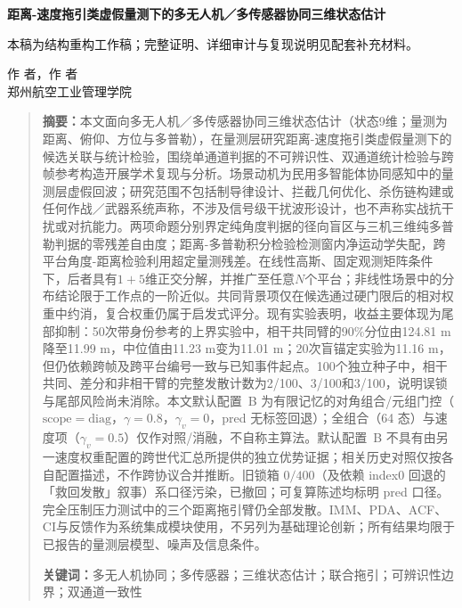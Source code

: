\documentclass[UTF8,a4paper,zihao=-4]{ctexart}
\begin{document}
\begin{center}{\LARGE\bfseries 距离-速度拖引类虚假量测下的多无人机／多传感器协同三维状态估计\par}\end{center}
本稿为结构重构工作稿；完整证明、详细审计与复现说明见配套补充材料。

\begin{center}作 者，作 者\\郑州航空工业管理学院\end{center}

\begin{quote}\small
\textbf{摘要：}本文面向多无人机／多传感器协同三维状态估计（状态9维；量测为距离、俯仰、方位与多普勒），在量测层研究距离-速度拖引类虚假量测下的候选关联与统计检验，围绕单通道判据的不可辨识性、双通道统计检验与跨帧参考构造开展学术复现与分析。场景动机为民用多智能体协同感知中的量测层虚假回波；研究范围不包括制导律设计、拦截几何优化、杀伤链构建或任何作战／武器系统声称，不涉及信号级干扰波形设计，也不声称实战抗干扰或对抗能力。两项命题分别界定纯角度判据的径向盲区与三机三维纯多普勒判据的零残差自由度；距离-多普勒积分检验检测窗内净运动学失配，跨平台角度-距离检验利用超定量测残差。在线性高斯、固定观测矩阵条件下，后者具有\(1+5\)维正交分解，并推广至任意\(N\)个平台；非线性场景中的分布结论限于工作点的一阶近似。共同背景项仅在候选通过硬门限后的相对权重中约消，复合权重仍属于启发式评分。现有实验表明，收益主要体现为尾部抑制：50次带身份参考的上界实验中，相干共同臂的90\%分位由124.81 m降至11.99 m，中位值由11.23 m变为11.01 m；20次盲锚定实验为11.16 m，但仍依赖跨帧及跨平台编号一致与已知事件起点。100个独立种子中，相干共同、差分和非相干臂的完整发散计数为2/100、3/100和3/100，说明误锁与尾部风险尚未消除。本文默认配置~B 为有限记忆的对角组合/元组门控（$\mathrm{scope}=\mathrm{diag}$，$\gamma=0.8$，$\gamma_v=0$，pred 无标签回退）；全组合（64 态）与速度项（$\gamma_v=0.5$）仅作对照/消融，不自称主算法。默认配置~B 不具有由另一速度权重配置的跨世代汇总所提供的独立优势证据；相关历史对照仅按各自配置描述，不作跨协议合并推断。旧锁箱 $0/400$（及依赖 index0 回退的「救回发散」叙事）系口径污染，已撤回；可复算陈述均标明 pred 口径。完全压制压力测试中的三个距离拖引臂仍全部发散。IMM、PDA、ACF、CI与反馈作为系统集成模块使用，不另列为基础理论创新；所有结果均限于已报告的量测层模型、噪声及信息条件。

\textbf{关键词：}多无人机协同；多传感器；三维状态估计；联合拖引；可辨识性边界；双通道一致性
\end{quote}
\end{document}
